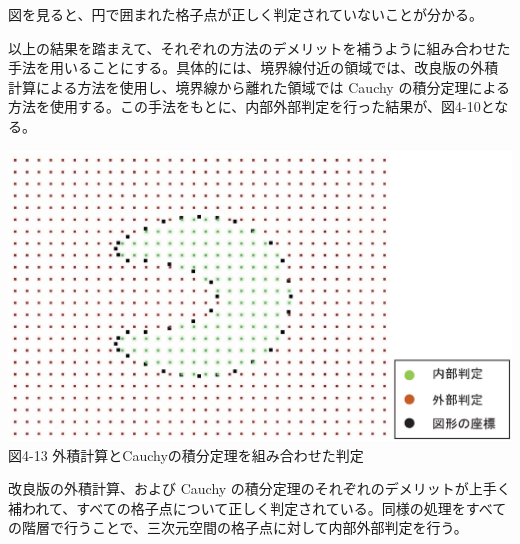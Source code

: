 図を見ると、円で囲まれた格子点が正しく判定されていないことが分かる。

以上の結果を踏まえて、それぞれの方法のデメリットを補うように組み合わせた手法を用いることにする。具体的には、境界線付近の領域では、改良版の外積計算による方法を使用し、境界線から離れた領域では Cauchy の積分定理による方法を使用する。この手法をもとに、内部外部判定を行った結果が、図4-10となる。

\begin{center}
  \includegraphics[width=14cm]{Cross-Cauchy_result.eps} \\
 \vspace{-5mm}
  図4-13 外積計算とCauchyの積分定理を組み合わせた判定
\end{center}

改良版の外積計算、および Cauchy の積分定理のそれぞれのデメリットが上手く補われて、すべての格子点について正しく判定されている。同様の処理をすべての階層で行うことで、三次元空間の格子点に対して内部外部判定を行う。


